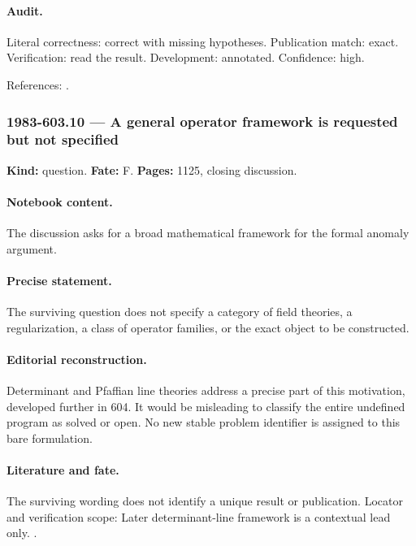 \paragraph{Audit.} Literal correctness: correct with missing hypotheses. Publication match: exact. Verification: read the result. Development: annotated. Confidence: high.

\noindent References: \citep{witten1982anomaly,wangwenwitten2019new,atiyahsinger1971index5}.\par

\subsubsection{1983-603.10 --- A general operator framework is requested but not specified}

\label{item:1983-603.10}

\noindent\textbf{Kind:} question. \textbf{Fate:} F. \textbf{Pages:} 1125, closing discussion.\par

\paragraph{Notebook content.} The discussion asks for a broad mathematical framework for the formal anomaly argument.

\paragraph{Precise statement.} The surviving question does not specify a category of field theories, a regularization, a class of operator families, or the exact object to be constructed.

\paragraph{Editorial reconstruction.} Determinant and Pfaffian line theories address a precise part of this motivation, developed further in 604. It would be misleading to classify the entire undefined program as solved or open. No new stable problem identifier is assigned to this bare formulation.

\paragraph{Literature and fate.} The surviving wording does not identify a unique result or publication. Locator and verification scope: Later determinant-line framework is a contextual lead only. \cite{daifreed1994eta}.

